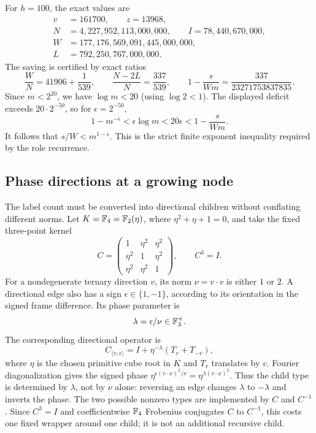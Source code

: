 For $h=100$, the exact values are
\begin{align*}
 v&=161700,\qquad z=13968,\\
 N&=4{,}227{,}952{,}113{,}000{,}000,\qquad I=78{,}440{,}670{,}000,\\
 W&=177{,}176{,}569{,}091{,}445{,}000{,}000,\\
 L&=792{,}250{,}767{,}000{,}000.
\end{align*}
The saving is certified by exact ratios
\[
 \frac WN=41906+\frac1{539},\qquad
 \frac{N-2L}{N}=\frac{337}{539},\qquad
 1-\frac{s}{Wm}=\frac{337}{23271753837835}.
\]
Since $m<2^{20}$, we have $\log m<20$ (using $\log 2<1$). The displayed deficit exceeds $20\cdot2^{-50}$, so for $\epsilon=2^{-50}$,
\[
 1-m^{-\epsilon}<\epsilon\log m<20\epsilon<1-\frac{s}{Wm}.
\]
It follows that $s/W<m^{1-\epsilon}$. This is the strict finite exponent inequality required by the role recurrence.

\subsection{Phase directions at a growing node}

The label count must be converted into directional children without conflating different norms. Let $K=\mathbb F_4=\mathbb F_2(\eta)$, where $\eta^2+\eta+1=0$, and take the fixed three-point kernel
\[
 C=\begin{pmatrix}1&\eta^2&\eta^2\\\eta^2&1&\eta^2\\\eta^2&\eta^2&1\end{pmatrix},\qquad C^3=I.
\]
For a nondegenerate ternary direction $v$, its norm $\nu=v\cdot v$ is either $1$ or $2$. A directional edge also has a sign $\epsilon\in\{1,-1\}$, according to its orientation in the signed frame difference. Its phase parameter is
\[
 \lambda=\epsilon/\nu\in\mathbb F_3^\times.
\]
The corresponding directional operator is
\[
 C_{\langle v,\epsilon\rangle}=I+\eta^{-\lambda}(T_v+T_{-v}),
\]
where $\eta$ is the chosen primitive cube root in $K$ and $T_v$ translates by $v$. Fourier diagonalization gives the signed phase $\eta^{\epsilon(v\cdot x)^2/\nu}=\eta^{\lambda(v\cdot x)^2}$. Thus the child type is determined by $\lambda$, not by $\nu$ alone: reversing an edge changes $\lambda$ to $-\lambda$ and inverts the phase. The two possible nonzero types are implemented by $C$ and $C^{-1}$. Since $C^3=I$ and coefficientwise $\mathbb F_4$ Frobenius conjugates $C$ to $C^{-1}$, this costs one fixed wrapper around one child; it is not an additional recursive child.

